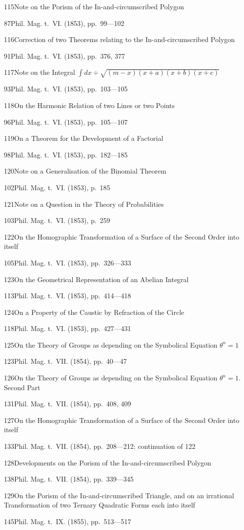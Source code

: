 \documentclass[11pt,a4paper]{book}
\providecommand{\tocentry}[2]{#1\dotfill #2\par}
\begin{document}
\tocentry{115}{Note on the Porism of the In-and-circumscribed Polygon}{87}{Phil. Mag. t.~VI. (1853), pp.~99---102}

\tocentry{116}{Correction of two Theorems relating to the In-and-circumscribed Polygon}{91}{Phil. Mag. t.~VI. (1853), pp.~376, 377}

\tocentry{117}{Note on the Integral $\int dx \div \sqrt{(m-x)(x+a)(x+b)(x+c)}$}{93}{Phil. Mag. t.~VI. (1853), pp.~103---105}

\tocentry{118}{On the Harmonic Relation of two Lines or two Points}{96}{Phil. Mag. t.~VI. (1853), pp.~105---107}

\tocentry{119}{On a Theorem for the Development of a Factorial}{98}{Phil. Mag. t.~VI. (1853), pp.~182---185}

\tocentry{120}{Note on a Generalisation of the Binomial Theorem}{102}{Phil. Mag. t.~VI. (1853), p.~185}

\tocentry{121}{Note on a Question in the Theory of Probabilities}{103}{Phil. Mag. t.~VI. (1853), p.~259}

\tocentry{122}{On the Homographic Transformation of a Surface of the Second Order into itself}{105}{Phil. Mag. t.~VI. (1853), pp.~326---333}

\tocentry{123}{On the Geometrical Representation of an Abelian Integral}{113}{Phil. Mag. t.~VI. (1853), pp.~414---418}

\tocentry{124}{On a Property of the Caustic by Refraction of the Circle}{118}{Phil. Mag. t.~VI. (1853), pp.~427---431}

\tocentry{125}{On the Theory of Groups as depending on the Symbolical Equation $\theta^n = 1$}{123}{Phil. Mag. t.~VII. (1854), pp.~40---47}

\tocentry{126}{On the Theory of Groups as depending on the Symbolical Equation $\theta^n = 1$. Second Part}{131}{Phil. Mag. t.~VII. (1854), pp.~408, 409}

\tocentry{127}{On the Homographic Transformation of a Surface of the Second Order into itself}{133}{Phil. Mag. t.~VII. (1854), pp.~208---212: continuation of 122}

\newpage

\tocentry{128}{Developments on the Porism of the In-and-circumscribed Polygon}{138}{Phil. Mag. t.~VII. (1854), pp.~339---345}

\tocentry{129}{On the Porism of the In-and-circumscribed Triangle, and on an irrational Transformation of two Ternary Quadratic Forms each into itself}{145}{Phil. Mag. t.~IX. (1855), pp.~513---517}
\end{document}

